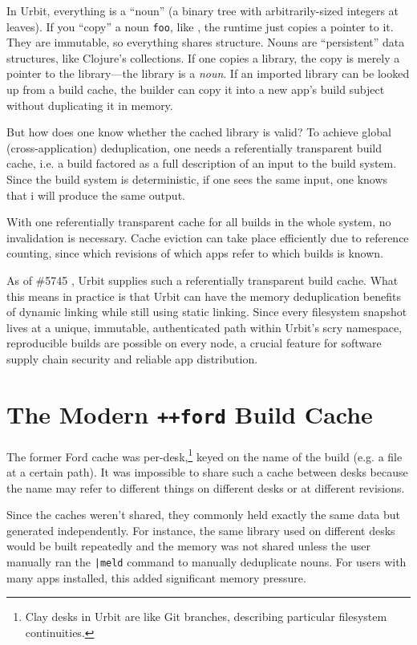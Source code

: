 \documentclass[twoside]{article}
\begin{document}
In Urbit, everything is a “noun” (a binary tree with arbitrarily-sized integers at leaves).  If you “copy” a noun \texttt{foo}, like \texttt{}, the runtime just copies a pointer to it.  They are immutable, so everything shares structure.  Nouns are “persistent” data structures, like Clojure's collections.  If one copies a library, the copy is merely a pointer to the library—the library is a \emph{noun}.  If an imported library can be looked up from a build cache, the builder can copy it into a new app's build subject without duplicating it in memory.  

But how does one know whether the cached library is valid?  To achieve global (cross-application) deduplication, one needs a referentially transparent build cache, i.e. a build factored as a full description of an input to the build system.  Since the build system is deterministic, if one sees the same input, one knows that i will produce the same output.

With one referentially transparent cache for all builds in the whole system, no invalidation is necessary.  Cache eviction can take place efficiently due to reference counting, since which revisions of which apps refer to which builds is known.

As of \#5745 \citep{Monk2022}, Urbit supplies such a referentially transparent build cache.  What this means in practice is that Urbit can have the memory deduplication benefits of dynamic linking while still using static linking.  Since every filesystem snapshot lives at a unique, immutable, authenticated path within Urbit's scry namespace, reproducible builds are possible on every node, a crucial feature for software supply chain security and reliable app distribution.

\section{The Modern \texttt{++ford} Build Cache}

The former Ford cache was per-desk,\footnote{Clay desks in Urbit are like Git branches, describing particular filesystem continuities.} keyed on the name of the build (e.g. a file at a certain path).  It was impossible to share such a cache between desks because the name may refer to different things on different desks or at different revisions.

Since the caches weren't shared, they commonly held exactly the same data but generated independently.  For instance, the same library used on different desks would be built repeatedly and the memory was not shared unless the user manually ran the \texttt{|meld} command to manually deduplicate nouns.  For users with many apps installed, this added significant memory pressure.
\end{document}
